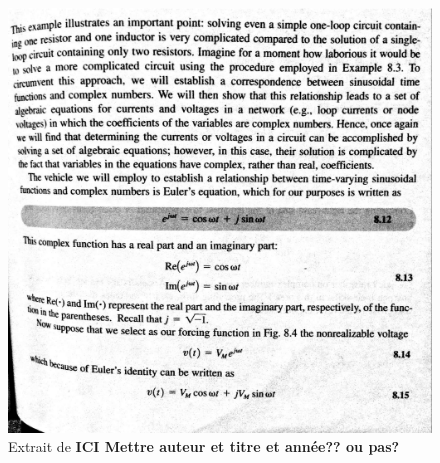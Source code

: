 \begin{figure}[b]
\begin{center}
\includegraphics[scale=0.5]{img/Irwin-1}
\end{center}
\caption{Extrait de \cite[p.~375]{Irwin}\textbf{ICI Mettre auteur et titre et année?? ou pas?}}%
\label{Trace 6}
\end{figure}

